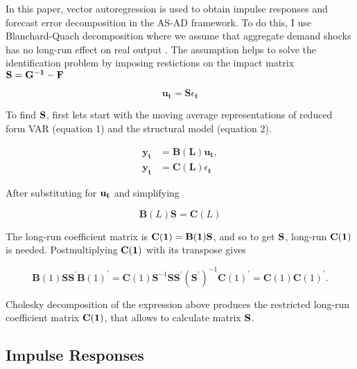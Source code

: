 \documentclass[a4paper,12pt]{article}
\begin{document}
In this paper, vector autoregression is used to obtain impulse responses and forecast error decomposition in the AS-AD framework. To do this, I use Blanchard-Quach decomposition where we assume that aggregate demand shocks has no long-run effect on real output \citep{blanchardquah89}. The assumption helps to solve the identification problem by imposing restictions on the impact matrix \(\bf S = G^{-1}-F\)

\begin{equation} \label{eq:4}
		\mathbf{u}_{\mathbf{t}}=\mathbf{S} \epsilon_{\mathbf{t}}
\end{equation}

To find \(\bf S\), first lets start with the moving average representations of reduced form VAR (equation 1) and the structural model (equation 2).

\begin{equation} \label{eq:5}
\begin{split}
		\mathbf{y}_{\mathbf{t}} &=\mathbf{B}(\mathbf{L}) \mathbf{u}_{\mathbf{t}}, \\
		\mathbf{y}_{\mathbf{t}} &=\mathbf{C}(\mathbf{L}) \epsilon_{\mathbf{t}}
\end{split}
\end{equation}

After substituting for \(\bf u_t\) and simplifying

\begin{equation} \label{eq:6}
		\mathbf{B}(L) \mathbf{S}=\mathbf{C}(L)
\end{equation}

The long-run coefficient matrix is \(\bf C(1) = B(1)S\), and so to get \(\bf S\), long-run \(\bf C(1)\) is needed. Postmultiplying \(\bf C(1)\) with its transpose gives

\begin{equation} \label{eq:7}
		\mathbf{B}(1) \mathbf{S S}^{\prime} \mathbf{B}(1)^{\prime}=\mathbf{C}(1) \mathbf{S}^{-1} \mathbf{S} \mathbf{S}^{\prime}\left(\mathbf{S}^{\prime}\right)^{-1} \mathbf{C}(1)^{\prime}=\mathbf{C}(1) \mathbf{C}(1)^{\prime}.
\end{equation}

Cholesky decomposition of the expression above produces the restricted long-run coefficient matrix \(\bf C(1)\), that allows to calculate matrix \(\bf S\).

\subsection{Impulse Responses}
\end{document}

